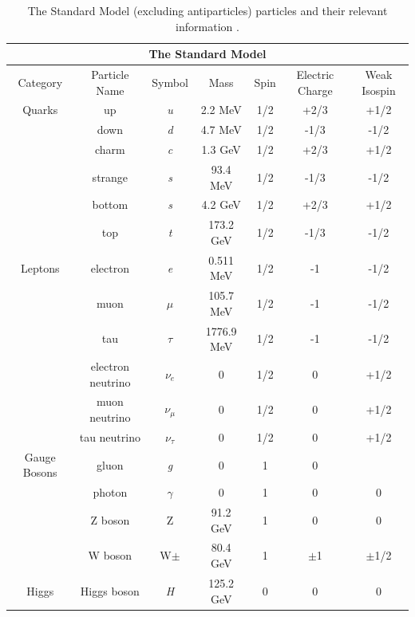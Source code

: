\newpage

\begin{table}[ht]
\centering 
\begin{small} 
\begin{tabular}{ |c || c | c | c | c | c| c|}
    \hline
    \multicolumn{7}{|c|}{The Standard Model}\\
    \hline
    Category& Particle Name& Symbol     & Mass    & Spin & Electric Charge & Weak Isospin \\
    \hline
    Quarks  &  up          & \textit{u} & 2.2 MeV & 1/2  & +2/3            & +1/2\\
            & down         & \textit{d} & 4.7 MeV & 1/2  & -1/3            & -1/2\\
    & charm & \textit{c}& 1.3 GeV& 1/2 & +2/3 & +1/2 \\
    & strange& \textit{s}& 93.4 MeV& 1/2& -1/3 & -1/2\\
    & bottom& \textit{s}& 4.2 GeV& 1/2& +2/3 & +1/2\\
    & top& \textit{t}& 173.2 GeV& 1/2& -1/3 & -1/2\\
    \hline
    Leptons& electron& \textit{e}& 0.511 MeV& 1/2& -1 & -1/2\\
    & muon& $\mu$& 105.7 MeV& 1/2& -1 & -1/2\\
    & tau& $\tau$&  1776.9 MeV& 1/2& -1 & -1/2\\
    & electron neutrino& $\nu_{\textit{e}}$& 0& 1/2& 0 & +1/2\\
    & muon neutrino& $\nu_{\mu}$& 0& 1/2& 0 & +1/2\\
    & tau neutrino& $\nu_{\tau}$& 0& 1/2& 0 & +1/2\\
    \hline
    Gauge Bosons& gluon& \textit{g}& 0 & 1 & 0 & \\
    & photon & $\gamma$& 0& 1& 0 & 0\\
    & Z boson & Z& 91.2 GeV & 1& 0 & 0\\
    & W boson & W$\pm$ & 80.4 GeV& 1& $\pm$1 &$\pm$1/2\\
    \hline
    Higgs& Higgs boson& \textit{H}& 125.2 GeV& 0& 0 & 0\\
    \hline 
 
\end{tabular}
\caption{The Standard Model (excluding antiparticles) particles and their relevant information \cite{workman}.}
\label{table:sm}
\end{small}
\end{table}
